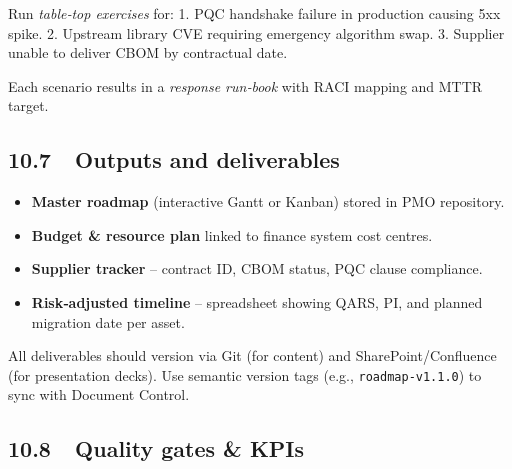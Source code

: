 \documentclass[
  english,
]{article}
\providecommand{\tightlist}{%
  \setlength{\itemsep}{0pt}\setlength{\parskip}{0pt}}
\begin{document}
Run \emph{table‑top exercises} for: 1. PQC handshake failure in
production causing 5xx spike. 2. Upstream library CVE requiring
emergency algorithm swap. 3. Supplier unable to deliver CBOM by
contractual date.

Each scenario results in a \emph{response run‑book} with RACI mapping
and MTTR target.

\subsection{10.7~~Outputs and
deliverables}\label{outputs-and-deliverables}

\begin{itemize}
\tightlist
\item
  \textbf{Master roadmap} (interactive Gantt or Kanban) stored in PMO
  repository.
\item
  \textbf{Budget \& resource plan} linked to finance system cost
  centres.
\item
  \textbf{Supplier tracker} -- contract ID, CBOM status, PQC clause
  compliance.
\item
  \textbf{Risk‑adjusted timeline} -- spreadsheet showing QARS, PI, and
  planned migration date per asset.
\end{itemize}

All deliverables should version via Git (for content) and
SharePoint/Confluence (for presentation decks). Use semantic version
tags (e.g., \texttt{roadmap‑v1.1.0}) to sync with Document Control.

\subsection{10.8~~Quality gates \& KPIs}\label{quality-gates-kpis}
\end{document}
